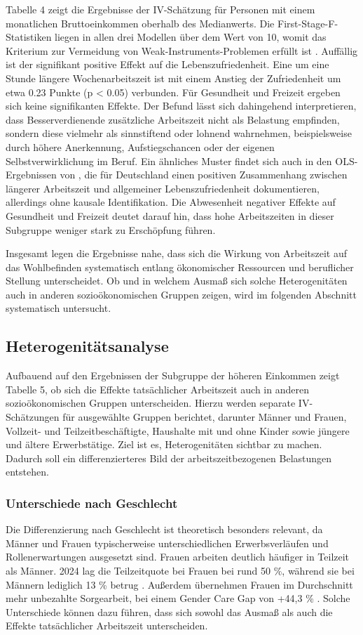 \documentclass[12pt,a4paper]{article}
\begin{document}
Tabelle 4 zeigt die Ergebnisse der IV-Schätzung für Personen mit einem monatlichen Bruttoeinkommen oberhalb des Medianwerts. Die First-Stage-F-Statistiken liegen in allen drei Modellen über dem Wert von 10, womit das Kriterium zur Vermeidung von Weak-Instruments-Problemen erfüllt ist \parencite{staiger1997}. Auffällig ist der signifikant positive Effekt auf die Lebenszufriedenheit. Eine um eine Stunde längere Wochenarbeitszeit ist mit einem Anstieg der Zufriedenheit um etwa 0{.}23 Punkte (p < 0{.}05) verbunden. Für Gesundheit und Freizeit ergeben sich keine signifikanten Effekte. Der Befund lässt sich dahingehend interpretieren, dass Besserverdienende zusätzliche Arbeitszeit nicht als Belastung empfinden, sondern diese vielmehr als sinnstiftend oder lohnend wahrnehmen, beispielsweise durch höhere Anerkennung, Aufstiegschancen oder der eigenen Selbstverwirklichung im Beruf. Ein ähnliches Muster findet sich auch in den OLS-Ergebnissen von \textcite{holly2012}, die für Deutschland einen positiven Zusammenhang zwischen längerer Arbeitszeit und allgemeiner Lebenszufriedenheit dokumentieren, allerdings ohne kausale Identifikation. Die Abwesenheit negativer Effekte auf Gesundheit und Freizeit deutet darauf hin, dass hohe Arbeitszeiten in dieser Subgruppe weniger stark zu Erschöpfung führen.

Insgesamt legen die Ergebnisse nahe, dass sich die Wirkung von Arbeitszeit auf das Wohlbefinden systematisch entlang ökonomischer Ressourcen und beruflicher Stellung unterscheidet. Ob und in welchem Ausmaß sich solche Heterogenitäten auch in anderen sozioökonomischen Gruppen zeigen, wird im folgenden Abschnitt systematisch untersucht. 

\subsection{Heterogenitätsanalyse}
Aufbauend auf den Ergebnissen der Subgruppe der höheren Einkommen zeigt Tabelle 5, ob sich die Effekte tatsächlicher Arbeitszeit auch in anderen sozioökonomischen Gruppen unterscheiden. Hierzu werden separate IV-Schätzungen für ausgewählte Gruppen berichtet, darunter Männer und Frauen, Vollzeit- und Teilzeitbeschäftigte, Haushalte mit und ohne Kinder sowie jüngere und ältere Erwerbstätige. Ziel ist es,  Heterogenitäten sichtbar zu machen. Dadurch soll ein differenzierteres Bild der arbeitszeitbezogenen Belastungen entstehen. 

\subsubsection{Unterschiede nach Geschlecht}
Die Differenzierung nach Geschlecht ist theoretisch besonders relevant, da Männer und Frauen typischerweise unterschiedlichen Erwerbsverläufen und Rollenerwartungen ausgesetzt sind. Frauen arbeiten deutlich häufiger in Teilzeit als Männer. 2024 lag die Teilzeitquote bei Frauen bei rund 50 \%, während sie bei Männern lediglich 13 \% betrug \parencite{destatis2025teilzeit}. Außerdem übernehmen Frauen im Durchschnitt mehr unbezahlte Sorgearbeit, bei einem Gender Care Gap von +44,3 \% \parencite{destatis2024care}.  Solche Unterschiede können dazu führen, dass sich sowohl das Ausmaß als auch die Effekte tatsächlicher Arbeitszeit unterscheiden.
\end{document}
